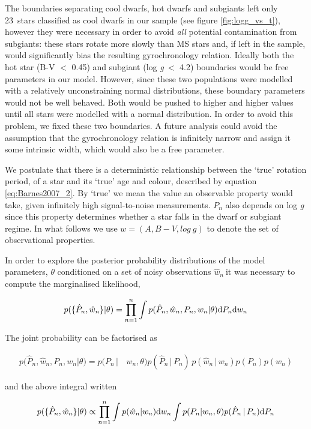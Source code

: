 \documentclass[10pt,preprint]{aastex}
\newcommand{\logg}{log \emph{g}}
\newcommand{\wh}{$\hat{w}_n$}
\newcommand{\ncooldwarfs}{23~}
\begin{document}
The boundaries separating cool dwarfs, hot dwarfs and subgiants left only \ncooldwarfs stars classified as cool dwarfs in our sample (see figure \ref{fig:logg_vs_t}), however they were necessary in order to avoid {\it all} potential contamination from subgiants: these stars rotate more slowly than MS stars and, if left in the sample, would significantly bias the resulting gyrochronology relation.
Ideally both the hot star (B-V $<$ 0.45) and subgiant (\logg$~<$ 4.2) boundaries would be free parameters in our model.
However, since these two populations were modelled with a relatively unconstraining normal distributions, these boundary parameters would not be well behaved.
Both would be pushed to higher and higher values until all stars were modelled with a normal distribution.
In order to avoid this problem, we fixed these two boundaries.
A future analysis could avoid the assumption that the gyrochronology relation is infinitely narrow and assign it some intrinsic width, which would also be a free parameter.

We postulate that there is a deterministic relationship between the `true' rotation period, of a star and its `true' age and colour, described by equation \ref{eq:Barnes2007_2}.
By `true' we mean the value an observable property would take, given infinitely high signal-to-noise measurements.
$P_n$ also depends on \logg$~$since this property determines whether a star falls in the dwarf or subgiant regime.
In what follows we use $w = (A, B-V, log~g)$ to denote the set of observational properties.

In order to explore the posterior probability distributions of the model parameters, $\theta$ conditioned on a set of noisy observations \wh$~$it was necessary to compute the marginalised likelihood,

\begin{equation}
	p(\{\hat{P}_n,\hat{w}_n\}|\theta) =
	\prod_{n=1}^{n} \int p(\hat{P}_n,\hat{w}_n,P_n,w_n|\theta)
	{\rm d}P_n {\rm d}w_n
\label{eq:fulll}
\end{equation}

The joint probability can be factorised as

\begin{align}
	p(\hat{P}_n,\hat{w}_n,P_n,w_n|\theta) = p(P_n\,| & \,w_n,\theta) p(\hat{P}_n\,|\,P_n)\,p(\hat{w}_n\,|\,w_n) p(P_n)p(w_n)
\nonumber
\end{align}

and the above integral written

\begin{equation}
	p(\{\hat{P}_n,\hat{w}_n\}|\theta) \propto
	\prod_{n=1}^{n} \int p(\hat{w}_n|w_n) {\rm d}w_n \int p(P_n|w_n,\theta) p(\hat{P}_n\,|\,P_n) {\rm d}P_n
\label{eq:fac}
\end{equation}
\end{document}
